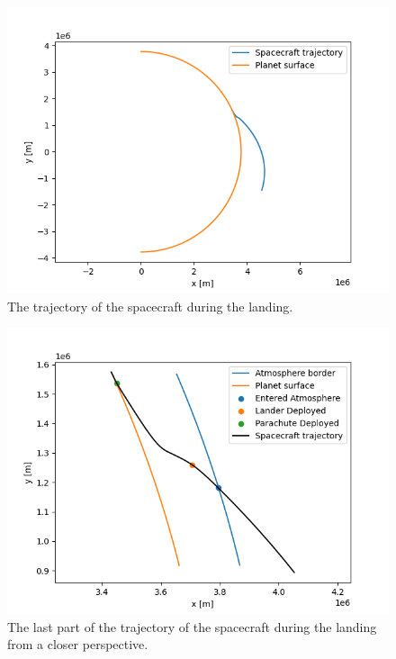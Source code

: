 \documentclass[reprint,english,notitlepage]{revtex4-2}
\begin{document}
\begin{figure}[h]
    \centering
    \includegraphics[scale=0.4]{Figures/landing_far}
    \caption{The trajectory of the spacecraft during the landing.}\label{fig:landing_far}
\end{figure}

\begin{figure}[h]
    \centering
    \includegraphics[scale=0.4]{Figures/landing_close}
    \caption{The last part of the trajectory of the spacecraft during the landing from a closer perspective.}\label{fig:landing_close}
\end{figure}
\end{document}
